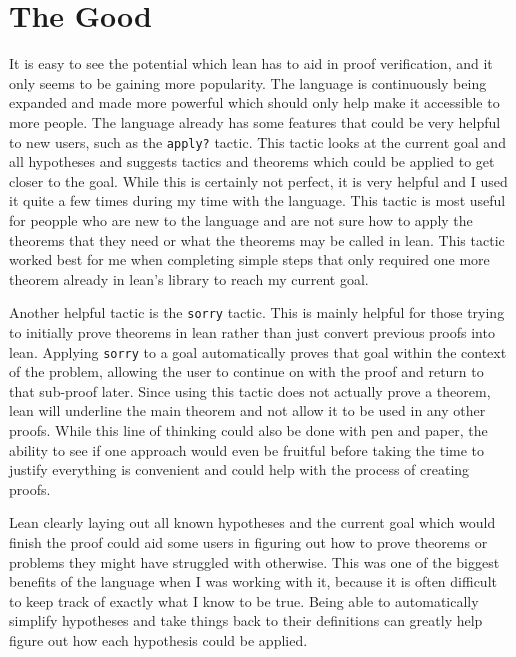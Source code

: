 \documentclass[
  letterpaper,
]{scrreprt}
\theoremstyle{remark}
\begin{document}
\hypertarget{the-good}{%
\section{The Good}\label{the-good}}

It is easy to see the potential which lean has to aid in proof
verification, and it only seems to be gaining more popularity. The
language is continuously being expanded and made more powerful which
should only help make it accessible to more people. The language already
has some features that could be very helpful to new users, such as the
\texttt{apply?} tactic. This tactic looks at the current goal and all
hypotheses and suggests tactics and theorems which could be applied to
get closer to the goal. While this is certainly not perfect, it is very
helpful and I used it quite a few times during my time with the
language. This tactic is most useful for peopple who are new to the
language and are not sure how to apply the theorems that they need or
what the theorems may be called in lean. This tactic worked best for me
when completing simple steps that only required one more theorem already
in lean's library to reach my current goal.

Another helpful tactic is the \texttt{sorry} tactic. This is mainly
helpful for those trying to initially prove theorems in lean rather than
just convert previous proofs into lean. Applying \texttt{sorry} to a
goal automatically proves that goal within the context of the problem,
allowing the user to continue on with the proof and return to that
sub-proof later. Since using this tactic does not actually prove a
theorem, lean will underline the main theorem and not allow it to be
used in any other proofs. While this line of thinking could also be done
with pen and paper, the ability to see if one approach would even be
fruitful before taking the time to justify everything is convenient and
could help with the process of creating proofs.

Lean clearly laying out all known hypotheses and the current goal which
would finish the proof could aid some users in figuring out how to prove
theorems or problems they might have struggled with otherwise. This was
one of the biggest benefits of the language when I was working with it,
because it is often difficult to keep track of exactly what I know to be
true. Being able to automatically simplify hypotheses and take things
back to their definitions can greatly help figure out how each
hypothesis could be applied.
\end{document}
